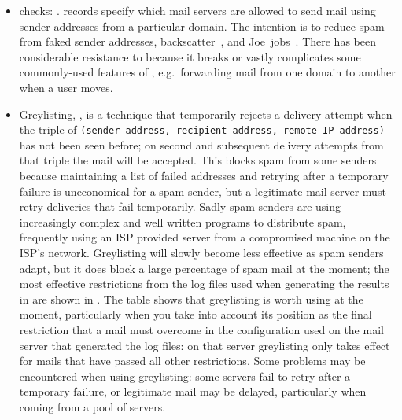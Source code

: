 \begin{itemize}

    \item {} checks:
        .
         records specify which mail servers are allowed to
        send mail using sender addresses from a particular domain.  The
        intention is to reduce spam from faked sender addresses,
        backscatter~\cite{postfix-backscatter}, and
        Joe~jobs~.  There has been considerable resistance
        to  because it breaks or vastly complicates some
        commonly-used features of , e.g.\ forwarding mail
        from one domain to another when a user moves.

    \item Greylisting,
        , is a
        technique that temporarily rejects a delivery attempt when the
        triple of \newline{} \tab{}\texttt{(sender address, recipient
        address, remote IP address)}\newline{} has not been seen before; on
        second and subsequent delivery attempts from that triple the mail
        will be accepted.  This blocks spam from some senders because
        maintaining a list of failed addresses and retrying after a
        temporary failure is uneconomical for a spam sender, but a
        legitimate mail server must retry deliveries that fail temporarily.
        Sadly spam senders are using increasingly complex and well written
        programs to distribute spam, frequently using an ISP provided
         server from a compromised machine on the ISP's
        network.  Greylisting will slowly become less effective as spam
        senders adapt, but it does block a large percentage of spam mail at
        the moment; the most effective restrictions from the
        \numberOFlogFILES{} log files used when generating the results in
         are shown in .  The table shows that greylisting is worth
        using at the moment, particularly when you take into account its
        position as the final restriction that a mail must overcome in the
        configuration used on the mail server that generated the log files:
        on that server greylisting only takes effect for mails that have
        passed all other restrictions.  Some problems may be encountered
        when using greylisting: some servers fail to retry after a
        temporary failure, or legitimate mail may be delayed, particularly
        when coming from a pool of servers.


\end{itemize}
